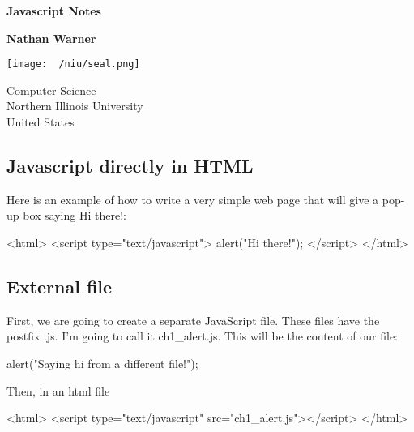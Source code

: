 \documentclass{report}
\title{\Huge{}}
\author{\huge{Nathan Warner}}
\date{\huge{}}
\begin{document}
        \begin{titlepage}
       \begin{center}
           \vspace*{1cm}
    
           \textbf{Javascript Notes}
    
           \vspace{0.5cm}
            
                
           \vspace{1.5cm}
    
           \textbf{Nathan Warner}
    
           \vfill
                
                
           \vspace{0.8cm}
         
           \texttt{[image: ~/niu/seal.png]}
                
           Computer Science \\
           Northern Illinois University\\
           United States\\
           
                
       \end{center}
    \end{titlepage}
    \tableofcontents
    \pagebreak 

    \bigbreak \noindent 
    \subsection{Javascript directly in HTML}
    \bigbreak \noindent 
    Here is an example of how to write a very simple web page that will give a pop-up box saying Hi there!:
    \bigbreak \noindent 
    \begin{htmlcode}
        <html>
            <script type="text/javascript"> alert("Hi there!");
            </script>
        </html>
    \end{htmlcode}
    \bigbreak \noindent 


    \bigbreak \noindent 
    \subsection{External file}
    \bigbreak \noindent 
    First, we are going to create a separate JavaScript file. These files have the postfix .js. I'm going to call it ch1\_alert.js. This will be the content of our file:
    \bigbreak \noindent 
    \begin{jscode}
        alert("Saying hi from a different file!");
    \end{jscode}
    \bigbreak \noindent
    Then, in an html file
    \bigbreak \noindent 
    \begin{htmlcode}
        <html>
            <script type="text/javascript" src="ch1_alert.js"></script>
        </html>
    \end{htmlcode}
\end{document}

